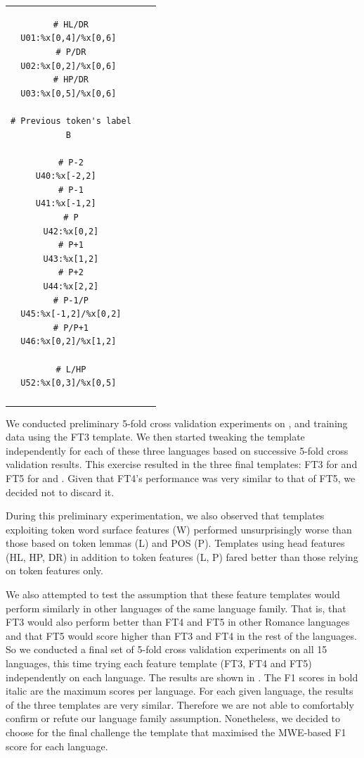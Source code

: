 \documentclass[output=paper,modfonts,nonflat]{langsci/langscibook}
\begin{document}
\begin{table}
{\begin{tabular}{ccc}
\begin{minipage}[t]{3.6cm}
\begin{verbatim}
# HL/DR
U01:%x[0,4]/%x[0,6] 
# P/DR
U02:%x[0,2]/%x[0,6] 
# HP/DR
U03:%x[0,5]/%x[0,6] 

# Previous token's label
B 

# P-2
U40:%x[-2,2]  
# P-1
U41:%x[-1,2]  
# P
U42:%x[0,2]
# P+1
U43:%x[1,2]
# P+2
U44:%x[2,2]
# P-1/P
U45:%x[-1,2]/%x[0,2]
# P/P+1
U46:%x[0,2]/%x[1,2] 

# L/HP
U52:%x[0,3]/%x[0,5] 
\end{verbatim}
\end{minipage}\\
\lspbottomrule
  \end{tabular}
} 
\end{table}

We conducted preliminary 5-fold cross validation experiments on ,  and
 training data using the FT3 template. We then started tweaking the template independently for each of these three languages based on successive 5-fold cross validation results. This exercise resulted in the three final templates: FT3 for  and FT5 for  and . Given that FT4's performance was very similar to that of FT5, we decided not to discard it. 

During this preliminary experimentation, we also observed that templates exploiting token
word surface features (W) performed unsurprisingly worse than those
based on token lemmas (L) and POS (P). Templates using head features
(HL, HP, DR) in addition to token features (L, P) fared better than
those relying on token features only. 

We also attempted to test the assumption that these feature templates would perform similarly in other languages of the same language family. That is, that FT3 would also perform better than FT4 and FT5 in other Romance languages and that FT5 would score higher than FT3 and FT4 in the rest of the languages. So we conducted a final set of 5-fold cross validation experiments on all 15 languages, this time trying each feature template (FT3, FT4 and FT5) independently on each language. The results are shown in . The F1 scores in bold italic are the maximum scores per language. For each given language, the results of the three templates are very similar. Therefore we are not able to comfortably confirm or refute our language family assumption. Nonetheless, we decided to choose for the final challenge the template that maximised the MWE-based F1 score for each language.
\end{document}
